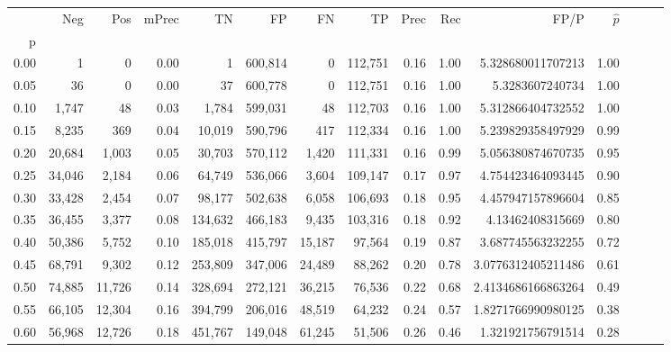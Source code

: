 \begin{tabular}{rrrrrrrrrrrrrrr}
\toprule
{} &     Neg &     Pos & mPrec &       TN &       FP &       FN &       TP &  Prec &   Rec &                   FP/P & $\hat{p}$ \\
p    &         &         &       &          &          &          &          &       &       &                        &           \\
\midrule
0.00 &       1 &       0 &  0.00 &        1 &  600,814 &        0 &  112,751 &  0.16 &  1.00 &      5.328680011707213 &      1.00 \\
0.05 &      36 &       0 &  0.00 &       37 &  600,778 &        0 &  112,751 &  0.16 &  1.00 &        5.3283607240734 &      1.00 \\
0.10 &   1,747 &      48 &  0.03 &    1,784 &  599,031 &       48 &  112,703 &  0.16 &  1.00 &      5.312866404732552 &      1.00 \\
0.15 &   8,235 &     369 &  0.04 &   10,019 &  590,796 &      417 &  112,334 &  0.16 &  1.00 &      5.239829358497929 &      0.99 \\
0.20 &  20,684 &   1,003 &  0.05 &   30,703 &  570,112 &    1,420 &  111,331 &  0.16 &  0.99 &      5.056380874670735 &      0.95 \\
0.25 &  34,046 &   2,184 &  0.06 &   64,749 &  536,066 &    3,604 &  109,147 &  0.17 &  0.97 &      4.754423464093445 &      0.90 \\
0.30 &  33,428 &   2,454 &  0.07 &   98,177 &  502,638 &    6,058 &  106,693 &  0.18 &  0.95 &      4.457947157896604 &      0.85 \\
0.35 &  36,455 &   3,377 &  0.08 &  134,632 &  466,183 &    9,435 &  103,316 &  0.18 &  0.92 &       4.13462408315669 &      0.80 \\
0.40 &  50,386 &   5,752 &  0.10 &  185,018 &  415,797 &   15,187 &   97,564 &  0.19 &  0.87 &      3.687745563232255 &      0.72 \\
0.45 &  68,791 &   9,302 &  0.12 &  253,809 &  347,006 &   24,489 &   88,262 &  0.20 &  0.78 &     3.0776312405211486 &      0.61 \\
0.50 &  74,885 &  11,726 &  0.14 &  328,694 &  272,121 &   36,215 &   76,536 &  0.22 &  0.68 &     2.4134686166863264 &      0.49 \\
0.55 &  66,105 &  12,304 &  0.16 &  394,799 &  206,016 &   48,519 &   64,232 &  0.24 &  0.57 &     1.8271766990980125 &      0.38 \\
0.60 &  56,968 &  12,726 &  0.18 &  451,767 &  149,048 &   61,245 &   51,506 &  0.26 &  0.46 &      1.321921756791514 &      0.28 \\

\end{tabular}
